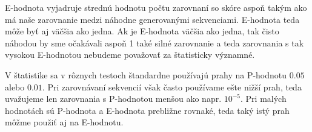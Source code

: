 E-hodnota vyjadruje strednú hodnotu počtu zarovnaní so skóre aspoň takým ako má naše zarovnanie medzi náhodne generovanými sekvenciami. E-hodnota teda môže byť aj väčšia ako jedna. Ak je E-hodnota väčšia ako jedna, tak čisto náhodou by sme očakávali aspoň 1 také silné zarovnanie a teda zarovnania s tak vysokou E-hodnotou nebudeme považovať za štatisticky významné.

V štatistike sa v rôznych testoch štandardne používajú prahy na P-hodnotu $0.05$ alebo $0.01$.
Pri zarovnávaní sekvencií však často používame ešte nižší prah, teda uvažujeme len zarovnania s P-hodnotou menšou ako napr. $10^{-5}$. Pri malých hodnotách sú P-hodnota a E-hodnota prebližne rovnaké, teda taký istý prah môžme použiť aj na E-hodnotu.